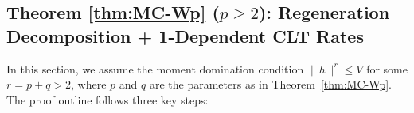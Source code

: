 \documentclass[mnsc,nonblindrev]{informs3}
\begin{document}

\subsection{Theorem \ref{thm:MC-Wp} ($p\geq 2$): Regeneration Decomposition +  1-Dependent CLT Rates}\label{sec:outline-MC-Wp}
In this section, we assume the moment domination condition $\|h\|^{r}\le V$ for
some $r=p+q>2$, where $p$ and $q$ are the parameters as in
Theorem~\ref{thm:MC-Wp}. The proof outline follows three key steps: 
\end{document}

